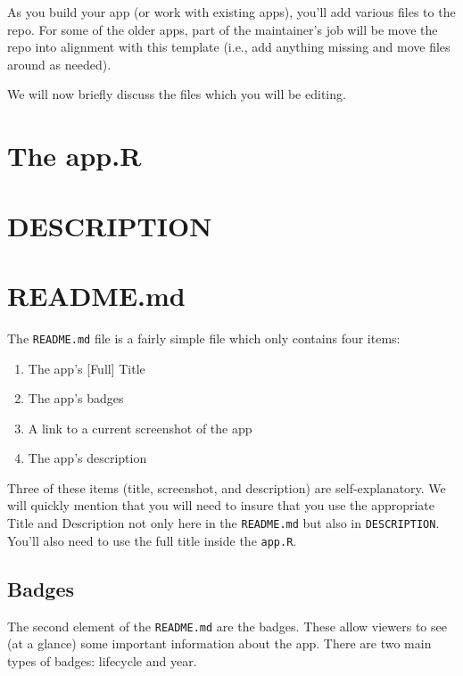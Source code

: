 \documentclass[
]{book}
\providecommand{\tightlist}{%
  \setlength{\itemsep}{0pt}\setlength{\parskip}{0pt}}
\begin{document}
As you build your app (or work with existing apps), you'll add various files to the repo. For some of the older apps, part of the maintainer's job will be move the repo into alignment with this template (i.e., add anything missing and move files around as needed).

We will now briefly discuss the files which you will be editing.

\hypertarget{appR}{%
\section{The app.R}\label{appR}}

\hypertarget{description}{%
\section{DESCRIPTION}\label{description}}

\hypertarget{readme}{%
\section{README.md}\label{readme}}

The \texttt{README.md} file is a fairly simple file which only contains four items:

\begin{enumerate}
\def\labelenumi{\arabic{enumi})}
\tightlist
\item
  The app's {[}Full{]} Title
\item
  The app's badges
\item
  A link to a current screenshot of the app
\item
  The app's description
\end{enumerate}

Three of these items (title, screenshot, and description) are self-explanatory. We will quickly mention that you will need to insure that you use the appropriate Title and Description not only here in the \texttt{README.md} but also in \texttt{DESCRIPTION}. You'll also need to use the full title inside the \texttt{app.R}.

\hypertarget{badges}{%
\subsection{Badges}\label{badges}}

The second element of the \texttt{README.md} are the badges. These allow viewers to see (at a glance) some important information about the app. There are two main types of badges: lifecycle and year.
\end{document}
